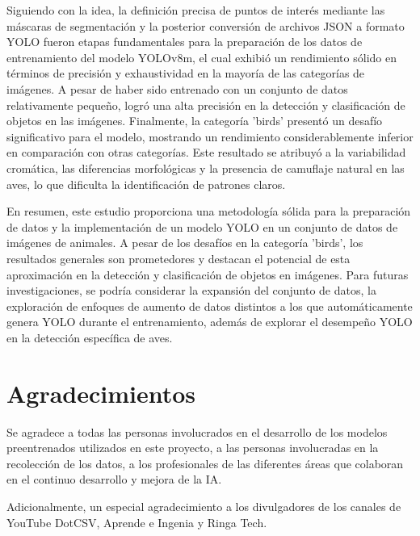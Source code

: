 \documentclass[journal]{IEEEtran}
\begin{document}
Siguiendo con la idea, la definición precisa de puntos de interés mediante las máscaras de segmentación y la posterior conversión de archivos JSON a formato YOLO fueron etapas fundamentales para la preparación de los datos de entrenamiento del modelo YOLOv8m, el cual exhibió un rendimiento sólido en términos de precisión y exhaustividad en la mayoría de las categorías de imágenes. A pesar de haber sido entrenado con un conjunto de datos relativamente pequeño, logró una alta precisión en la detección y clasificación de objetos en las imágenes. Finalmente, la categoría 'birds' presentó un desafío significativo para el modelo, mostrando un rendimiento considerablemente inferior en comparación con otras categorías. Este resultado se atribuyó a la variabilidad cromática, las diferencias morfológicas y la presencia de camuflaje natural en las aves, lo que dificulta la identificación de patrones claros.

En resumen, este estudio proporciona una metodología sólida para la preparación de datos y la implementación de un modelo YOLO en un conjunto de datos de imágenes de animales. A pesar de los desafíos en la categoría 'birds', los resultados generales son prometedores y destacan el potencial de esta aproximación en la detección y clasificación de objetos en imágenes. Para futuras investigaciones, se podría considerar la expansión del conjunto de datos, la exploración de enfoques de aumento de datos distintos a los que automáticamente genera YOLO durante el entrenamiento, además de explorar el desempeño YOLO en la detección específica de aves.

\section*{Agradecimientos}
Se agradece a todas las personas involucrados en el desarrollo de los modelos preentrenados utilizados en este proyecto, a las personas involucradas en la recolección de los datos, a los profesionales de las diferentes áreas que colaboran en el continuo desarrollo y mejora de la IA.

Adicionalmente, un especial agradecimiento a los divulgadores de los canales de YouTube DotCSV, Aprende e Ingenia y Ringa Tech.



\end{document}
